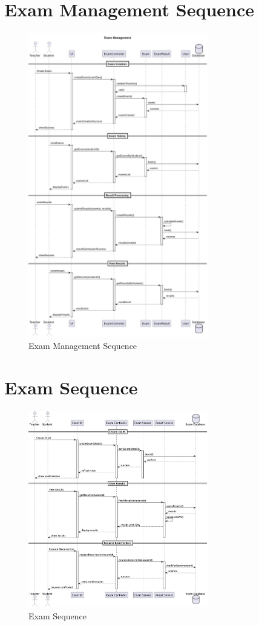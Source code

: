 \documentclass[12pt,a4paper]{report}
\begin{document}
\section{Exam Management Sequence}
\begin{figure}[htbp]
    \centering
    \includegraphics[width=0.7\textwidth]{exam-management-sequence.png}
    \caption{Exam Management Sequence}
    \label{fig:exam-management-sequence}
\end{figure}

\section{Exam Sequence}
\begin{figure}[htbp]
    \centering
    \includegraphics[width=0.7\textwidth]{exam-sequence.png}
    \caption{Exam Sequence}
    \label{fig:exam-sequence}
\end{figure}
\end{document}

